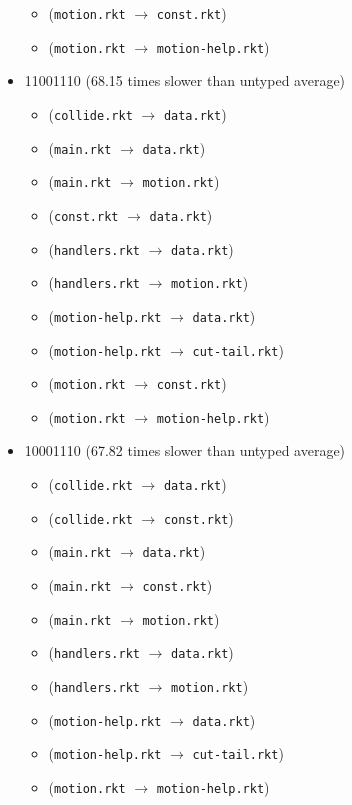 \documentclass{article}
\newcommand{\mono}[1]{\texttt{#1}}
\begin{document}
\begin{itemize}
\begin{itemize}
  \item (\mono{motion.rkt} $\rightarrow$ \mono{const.rkt})
  \item (\mono{motion.rkt} $\rightarrow$ \mono{motion-help.rkt})
  \end{itemize}
\item 11001110 (68.15 times slower than untyped average)
  \begin{itemize}
  \item (\mono{collide.rkt} $\rightarrow$ \mono{data.rkt})
  \item (\mono{main.rkt} $\rightarrow$ \mono{data.rkt})
  \item (\mono{main.rkt} $\rightarrow$ \mono{motion.rkt})
  \item (\mono{const.rkt} $\rightarrow$ \mono{data.rkt})
  \item (\mono{handlers.rkt} $\rightarrow$ \mono{data.rkt})
  \item (\mono{handlers.rkt} $\rightarrow$ \mono{motion.rkt})
  \item (\mono{motion-help.rkt} $\rightarrow$ \mono{data.rkt})
  \item (\mono{motion-help.rkt} $\rightarrow$ \mono{cut-tail.rkt})
  \item (\mono{motion.rkt} $\rightarrow$ \mono{const.rkt})
  \item (\mono{motion.rkt} $\rightarrow$ \mono{motion-help.rkt})
  \end{itemize}
\item 10001110 (67.82 times slower than untyped average)
  \begin{itemize}
  \item (\mono{collide.rkt} $\rightarrow$ \mono{data.rkt})
  \item (\mono{collide.rkt} $\rightarrow$ \mono{const.rkt})
  \item (\mono{main.rkt} $\rightarrow$ \mono{data.rkt})
  \item (\mono{main.rkt} $\rightarrow$ \mono{const.rkt})
  \item (\mono{main.rkt} $\rightarrow$ \mono{motion.rkt})
  \item (\mono{handlers.rkt} $\rightarrow$ \mono{data.rkt})
  \item (\mono{handlers.rkt} $\rightarrow$ \mono{motion.rkt})
  \item (\mono{motion-help.rkt} $\rightarrow$ \mono{data.rkt})
  \item (\mono{motion-help.rkt} $\rightarrow$ \mono{cut-tail.rkt})
  \item (\mono{motion.rkt} $\rightarrow$ \mono{motion-help.rkt})
  \end{itemize}


\end{itemize}
\end{document}
